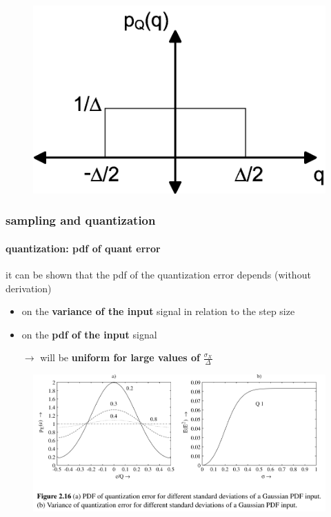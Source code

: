 \begin{frame}
		\pause
		\vspace{-3mm}
    	\begin{figure}[!hbt]
			\begin{center}
			\includegraphics[scale=0.15]{Graph/QuantError_ADV}
			\end{center}
		\end{figure}
	\end{frame}
	\begin{frame}\frametitle{sampling and quantization}\framesubtitle{quantization: pdf of quant error}
        \vspace{-3mm}
        it can be shown that the pdf of the quantization error depends (without derivation)
        \begin{itemize}
            \item on the \textbf{variance of the input} signal in relation to the step size
            \item   on the \textbf{pdf of the input} signal
            \pause
            \item[$\rightarrow$]   will be \textbf{uniform for large values of} $\frac{\sigma_X}{\Delta}$
        \end{itemize}
    	\begin{figure}
			\includegraphics[scale=0.5]{Graph/pdfquanterr_variance}
		\end{figure}
	\end{frame}
